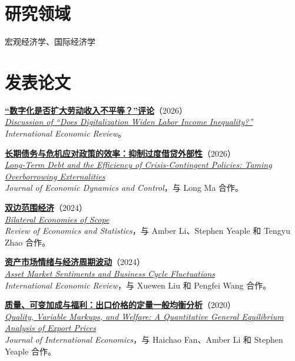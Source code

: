 \documentclass[11pt]{res}
\newcommand{\paperzh}[4]{%
  \textbf{\href{#1}{#2}}（#4）\\[-0.02in]
  {\small\itshape\href{#1}{#3}}%
}
\newenvironment{cvitem}
  {\par\noindent\hspace{-0.42in}\begin{minipage}{\linewidth}}
  {\end{minipage}\par\vspace{0.05in}}
\begin{document}
\begin{resume}
\section{\bf 研究领域}
\vspace{0.1in}
\hspace{-0.42in} 宏观经济学、国际经济学

\section{\bf 发表论文}
\vspace{0.1in}

\begin{cvitem}
\paperzh{https://doi.org/10.1111/iere.70111}
  {“数字化是否扩大劳动收入不平等？”评论}
  {Discussion of ``Does Digitalization Widen Labor Income Inequality?''}{2026}\\
\textit{International Economic Review}。
\end{cvitem}

\begin{cvitem}
\paperzh{https://doi.org/10.1016/j.jedc.2025.105253}
  {长期债务与危机应对政策的效率：抑制过度借贷外部性}
  {Long-Term Debt and the Efficiency of Crisis-Contingent Policies:
  Taming Overborrowing Externalities}{2026}\\
\textit{Journal of Economic Dynamics and Control}，与 Long Ma 合作。
\end{cvitem}

\begin{cvitem}
\paperzh{https://doi.org/10.1162/rest_a_01543}
  {双边范围经济}
  {Bilateral Economies of Scope}{2024}\\
\textit{Review of Economics and Statistics}，与 Amber Li、Stephen Yeaple
和 Tengyu Zhao 合作。
\end{cvitem}

\begin{cvitem}
\paperzh{https://doi.org/10.1111/iere.12700}
  {资产市场情绪与经济周期波动}
  {Asset Market Sentiments and Business Cycle Fluctuations}{2024}\\
\textit{International Economic Review}，与 Xuewen Liu 和 Pengfei Wang 合作。
\end{cvitem}

\begin{cvitem}
\paperzh{https://doi.org/10.1016/j.jinteco.2020.103317}
  {质量、可变加成与福利：出口价格的定量一般均衡分析}
  {Quality, Variable Markups, and Welfare: A Quantitative General Equilibrium
  Analysis of Export Prices}{2020}\\
\textit{Journal of International Economics}，与 Haichao Fan、Amber Li
和 Stephen Yeaple 合作。
\end{cvitem}


\end{resume}
\end{document}
